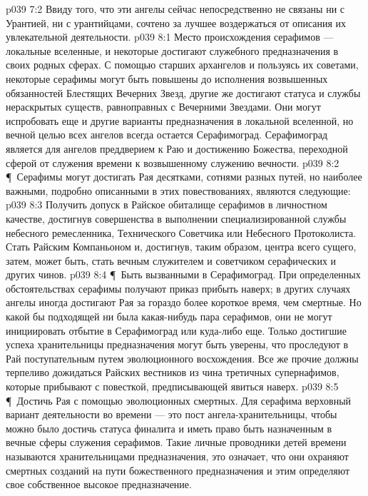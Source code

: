 \vs p039 7:2 Ввиду того, что эти ангелы сейчас непосредственно не связаны ни с Урантией, ни с урантийцами, сочтено за лучшее воздержаться от описания их увлекательной деятельности.
\vs p039 8:1 Место происхождения серафимов --- локальные вселенные, и некоторые достигают служебного предназначения в своих родных сферах. С помощью старших архангелов и пользуясь их советами, некоторые серафимы могут быть повышены до исполнения возвышенных обязанностей Блестящих Вечерних Звезд, другие же достигают статуса и службы нераскрытых существ, равноправных с Вечерними Звездами. Они могут испробовать еще и другие варианты предназначения в локальной вселенной, но вечной целью всех ангелов всегда остается Серафимоград. Серафимоград является для ангелов преддверием к Раю и достижению Божества, переходной сферой от служения времени к возвышенному служению вечности.
\vs p039 8:2 \P\ Серафимы могут достигать Рая десятками, сотнями разных путей, но наиболее важными, подробно описанными в этих повествованиях, являются следующие:
\vs p039 8:3 \bibnobreakspace Получить допуск в Райское обиталище серафимов в личностном качестве, достигнув совершенства в выполнении специализированной службы небесного ремесленника, Технического Советчика или Небесного Протоколиста. Стать Райским Компаньоном и, достигнув, таким образом, центра всего сущего, затем, может быть, стать вечным служителем и советчиком серафических и других чинов.
\vs p039 8:4 \P\ \bibnobreakspace Быть вызванными в Серафимоград. При определенных обстоятельствах серафимы получают приказ прибыть наверх; в других случаях ангелы иногда достигают Рая за гораздо более короткое время, чем смертные. Но какой бы подходящей ни была какая\hyp{}нибудь пара серафимов, они не могут инициировать отбытие в Серафимоград или куда\hyp{}либо еще. Только достигшие успеха хранительницы предназначения могут быть уверены, что проследуют в Рай поступательным путем эволюционного восхождения. Все же прочие должны терпеливо дожидаться Райских вестников из чина третичных супернафимов, которые прибывают с повесткой, предписывающей явиться наверх.
\vs p039 8:5 \P\ \bibnobreakspace Достичь Рая с помощью эволюционных смертных. Для серафима верховный вариант деятельности во времени --- это пост ангела\hyp{}хранительницы, чтобы можно было достичь статуса финалита и иметь право быть назначенным в вечные сферы служения серафимов. Такие личные проводники детей времени называются хранительницами предназначения, это означает, что они охраняют смертных созданий на пути божественного предназначения и этим определяют свое собственное высокое предназначение.
